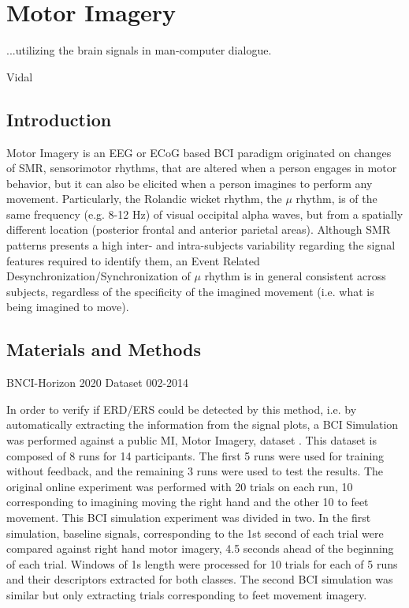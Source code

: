 \chapter{Motor Imagery}
\label{chapter:five}
\epigraph{...utilizing the brain signals in man-computer dialogue.}{Vidal}

\section{Introduction}

Motor Imagery is an EEG or ECoG based BCI paradigm originated on changes of SMR, sensorimotor rhythms, that are altered when a person engages in motor behavior, but it can also be elicited when a person imagines to perform any movement. Particularly, the Rolandic wicket rhythm, the $\mu$ rhythm, is of the same frequency (e.g. 8-12 Hz) of visual occipital alpha waves, but from a spatially different location (posterior frontal and anterior parietal areas)\cite{WolpawJonathanR2012}.   Although SMR patterns presents a high inter- and intra-subjects variability regarding the signal features required to identify them, an Event Related Desynchronization/Synchronization of $\mu$ rhythm is in general consistent across subjects, regardless of the specificity of the imagined movement (i.e. what is being imagined to move).

\section{Materials and Methods}


BNCI-Horizon 2020 Dataset 002-2014



In order to verify if ERD/ERS could be detected by this method, i.e. by automatically extracting the information from the signal plots, a BCI Simulation was performed against a public MI, Motor Imagery, dataset \cite{Steyrl2015}.  This dataset is composed of 8 runs for 14 participants.  The first 5 runs were used for training without feedback, and the remaining 3 runs were used to test the results.  The original online experiment was performed with 20 trials on each run, 10 corresponding to imagining moving the right hand and the other 10 to feet movement.  This BCI simulation experiment was divided in two.  In the first simulation, baseline signals, corresponding to the 1st second of each trial were compared against right hand motor imagery, 4.5 seconds ahead of the beginning of each trial. Windows of 1s length were processed for 10 trials for each of 5 runs and their descriptors extracted for both classes.  The second BCI simulation was similar but only extracting trials corresponding to feet movement imagery.


